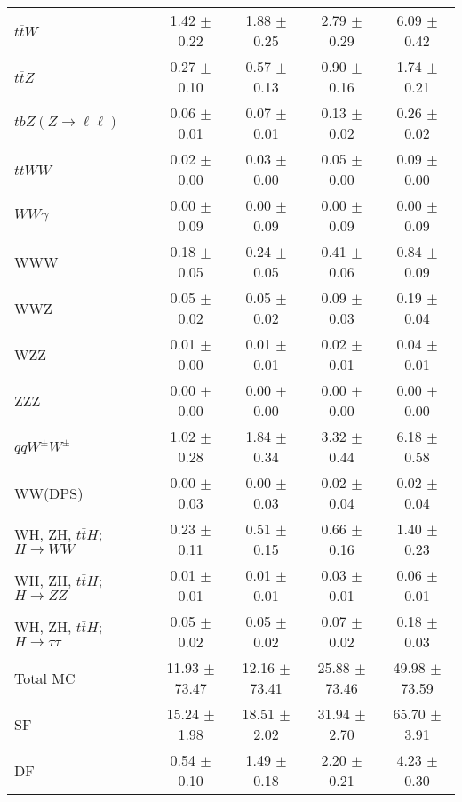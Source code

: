 \begin{tabular}{l|cccc}
                   $t\overline{t}W$ &  1.42 $\pm$  0.22 &  1.88 $\pm$  0.25 &  2.79 $\pm$  0.29 &  6.09 $\pm$  0.42 \\
                   $t\overline{t}Z$ &  0.27 $\pm$  0.10 &  0.57 $\pm$  0.13 &  0.90 $\pm$  0.16 &  1.74 $\pm$  0.21 \\
    $tbZ (Z \rightarrow \ell \ell)$ &  0.06 $\pm$  0.01 &  0.07 $\pm$  0.01 &  0.13 $\pm$  0.02 &  0.26 $\pm$  0.02 \\
                  $t\overline{t}WW$ &  0.02 $\pm$  0.00 &  0.03 $\pm$  0.00 &  0.05 $\pm$  0.00 &  0.09 $\pm$  0.00 \\
                         $WW\gamma$ &  0.00 $\pm$  0.09 &  0.00 $\pm$  0.09 &  0.00 $\pm$  0.09 &  0.00 $\pm$  0.09 \\
                                WWW &  0.18 $\pm$  0.05 &  0.24 $\pm$  0.05 &  0.41 $\pm$  0.06 &  0.84 $\pm$  0.09 \\
                                WWZ &  0.05 $\pm$  0.02 &  0.05 $\pm$  0.02 &  0.09 $\pm$  0.03 &  0.19 $\pm$  0.04 \\
                                WZZ &  0.01 $\pm$  0.00 &  0.01 $\pm$  0.01 &  0.02 $\pm$  0.01 &  0.04 $\pm$  0.01 \\
                                ZZZ &  0.00 $\pm$  0.00 &  0.00 $\pm$  0.00 &  0.00 $\pm$  0.00 &  0.00 $\pm$  0.00 \\
                 $qqW^{\pm}W^{\pm}$ &  1.02 $\pm$  0.28 &  1.84 $\pm$  0.34 &  3.32 $\pm$  0.44 &  6.18 $\pm$  0.58 \\
                            WW(DPS) &  0.00 $\pm$  0.03 &  0.00 $\pm$  0.03 &  0.02 $\pm$  0.04 &  0.02 $\pm$  0.04 \\
WH, ZH, $t\bar{t}H$; $H \rightarrow WW$ &  0.23 $\pm$  0.11 &  0.51 $\pm$  0.15 &  0.66 $\pm$  0.16 &  1.40 $\pm$  0.23 \\
WH, ZH, $t\bar{t}H$; $H \rightarrow ZZ$ &  0.01 $\pm$  0.01 &  0.01 $\pm$  0.01 &  0.03 $\pm$  0.01 &  0.06 $\pm$  0.01 \\
WH, ZH, $t\bar{t}H$; $H \rightarrow \tau\tau$ &  0.05 $\pm$  0.02 &  0.05 $\pm$  0.02 &  0.07 $\pm$  0.02 &  0.18 $\pm$  0.03 \\
\hline\hline
                           Total MC & 11.93 $\pm$ 73.47 & 12.16 $\pm$ 73.41 & 25.88 $\pm$ 73.46 & 49.98 $\pm$ 73.59 \\
\hline
                                 SF & 15.24 $\pm$  1.98 & 18.51 $\pm$  2.02 & 31.94 $\pm$  2.70 & 65.70 $\pm$  3.91 \\
                                 DF &  0.54 $\pm$  0.10 &  1.49 $\pm$  0.18 &  2.20 $\pm$  0.21 &  4.23 $\pm$  0.30 \\

\end{tabular}
